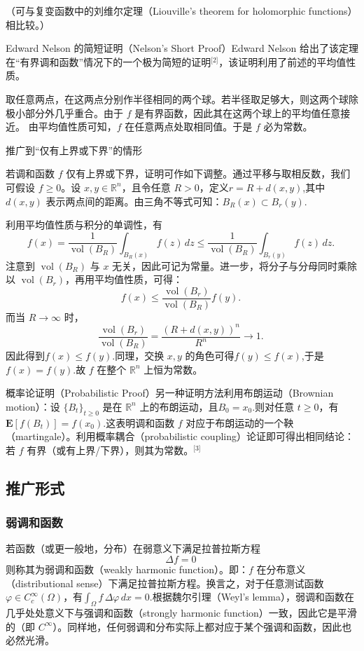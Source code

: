 （可与复变函数中的刘维尔定理（Liouville's theorem for holomorphic functions）相比较。）

Edward Nelson 的简短证明（Nelson’s Short Proof）Edward Nelson 给出了该定理在“有界调和函数”情况下的一个极为简短的证明\(^\text{[2]}\)，该证明利用了前述的平均值性质。

取任意两点，在这两点分别作半径相同的两个球。若半径取足够大，则这两个球除极小部分外几乎重合。由于 \( f \) 是有界函数，因此其在这两个球上的平均值任意接近。  由平均值性质可知，\( f \) 在任意两点处取相同值。于是 \( f \) 必为常数。

推广到“仅有上界或下界”的情形

若调和函数 \( f \) 仅有上界或下界，证明可作如下调整。通过平移与取相反数，我们可假设 \( f \ge 0 \)。设 \(x, y \in \mathbb{R}^n\)，且令任意 \(R > 0\)，定义\(r = R + d(x, y)\),其中 \(d(x,y)\) 表示两点间的距离。由三角不等式可知：\(B_R(x) \subset B_r(y)\).

利用平均值性质与积分的单调性，有
\[
f(x)
=
\frac{1}{\operatorname{vol}(B_R)}
\int_{B_R(x)} f(z)\,dz
\le
\frac{1}{\operatorname{vol}(B_R)}
\int_{B_r(y)} f(z)\,dz.~
\]
注意到 \(\operatorname{vol}(B_R)\) 与 \(x\) 无关，因此可记为常量。进一步，将分子与分母同时乘除以 \(\operatorname{vol}(B_r)\)，再用平均值性质，可得：
\[
f(x)
\le
\frac{\operatorname{vol}(B_r)}{\operatorname{vol}(B_R)} f(y).~
\]
而当 \(R \to \infty\) 时，
\[
\frac{\operatorname{vol}(B_r)}{\operatorname{vol}(B_R)}
=
\frac{(R + d(x,y))^n}{R^n}
\to 1.~
\]
因此得到\(f(x) \le f(y)\).同理，交换 \(x, y\) 的角色可得\(f(y) \le f(x)\),于是\(f(x) = f(y)\).故 \( f \) 在整个 \(\mathbb{R}^n\) 上恒为常数。

概率论证明（Probabilistic Proof）另一种证明方法利用布朗运动（Brownian motion）：设 \(\{B_t\}_{t \ge 0}\) 是在 \(\mathbb{R}^n\) 上的布朗运动，且\(B_0 = x_0\).则对任意 \(t \ge 0\)，有\(\mathbf{E}[f(B_t)] = f(x_0)\).这表明调和函数 \(f\) 对应于布朗运动的一个鞅（martingale）。利用概率耦合（probabilistic coupling）论证即可得出相同结论：若 \(f\) 有界（或有上界/下界），则其为常数。\(^\text{[3]}\)
\subsection{推广形式}
\subsubsection{弱调和函数}
若函数（或更一般地，分布）在弱意义下满足拉普拉斯方程
\[
\Delta f = 0~
\]
则称其为弱调和函数（weakly harmonic function）。即：\(f\) 在分布意义（distributional sense）下满足拉普拉斯方程。换言之，对于任意测试函数 \(\varphi \in C_c^\infty(\Omega)\)，有\(\int_{\Omega} f \, \Delta \varphi \, dx = 0.\)根据魏尔引理（Weyl’s lemma），弱调和函数在几乎处处意义下与强调和函数（strongly harmonic function）一致，因此它是平滑的（即 \(C^\infty\)）。同样地，任何弱调和分布实际上都对应于某个强调和函数，因此也必然光滑。

